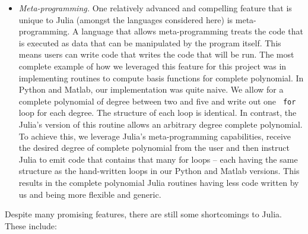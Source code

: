 \begin{itemize}
  \item \textit{Meta-programming.} One relatively advanced and compelling
  feature that is unique to Julia (amongst the languages considered here) is
  meta-programming. A language that allows meta-programming treats the code
  that is executed as data that can be manipulated by the program itself. This
  means users can write code that writes the code that will be run. The most
  complete example of how we leveraged this feature for this project was in
  implementing routines to compute basis functions for complete polynomial. In
  Python and Matlab, our implementation was quite naive. We allow for a
  complete polynomial of degree between two and five and write out one \texttt{
  for} loop for each degree. The structure of each loop is identical. In
  contrast, the Julia's version of this routine allows an arbitrary degree
  complete polynomial. To achieve this, we leverage Julia's meta-programming
  capabilities, receive the desired degree of complete polynomial from the user
  and then instruct Julia to emit code that contains that many for loops --
  each having the same structure as the hand-written loops in our Python and
  Matlab versions. This results in the complete polynomial Julia routines
  having less code written by us and being more flexible and generic.

\end{itemize}

Despite many promising features, there are still some shortcomings to Julia.
These include:

